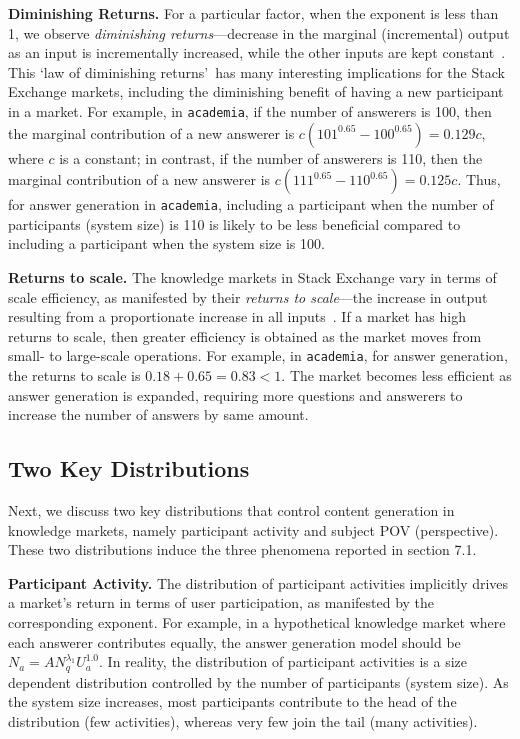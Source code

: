 \textbf{Diminishing Returns.} For a particular factor, when the exponent is less than 1, we observe \emph{diminishing returns}---decrease in the marginal (incremental) output as an input is incrementally increased, while the other inputs are kept constant~\cite{wiki}. This \lq law of diminishing returns\rq\ has many interesting implications for the Stack Exchange markets, including the diminishing benefit of having a new participant in a market. For example, in \texttt{academia}, if the number of answerers is 100, then the marginal contribution of a new answerer is $c(101^{0.65} - 100^{0.65}) = 0.129c$, where $c$ is a constant; in contrast, if the number of answerers is 110, then the marginal contribution of a new answerer is $c(111^{0.65} - 110^{0.65}) = 0.125c$. Thus, for answer generation in \texttt{academia}, including a participant when the number of participants (system size) is 110 is likely to be less beneficial compared to including a participant when the system size is 100.

\textbf{Returns to scale.} The knowledge markets in Stack Exchange vary in terms of scale efficiency, as manifested by their \emph{returns to scale}---the increase in output resulting from a proportionate increase in all inputs~\cite{wiki}. If a market has high returns to scale, then greater efficiency is obtained as the market moves from small- to large-scale operations. For example, in \texttt{academia}, for answer generation, the returns to scale is $0.18+0.65=0.83<1$. The market becomes less efficient as answer generation is expanded, requiring more questions and answerers to increase the number of answers by same amount. 

\subsection{Two Key Distributions} 
Next, we discuss two key distributions that control content generation in knowledge markets, namely participant activity and subject POV (perspective). These two distributions induce the three phenomena reported in section 7.1. 

\textbf{Participant Activity.} The distribution of participant activities implicitly drives a market's return in terms of user participation, as manifested by the corresponding exponent. For example, in a hypothetical knowledge market where each answerer contributes equally, the answer generation model should be $N_a = AN_q^{\lambda_1}U_a^{1.0}$. In reality, the distribution of participant activities is a size dependent distribution controlled by the number of participants (system size). As the system size increases, most participants contribute to the head of the distribution (few activities), whereas very few join the tail (many activities). 

